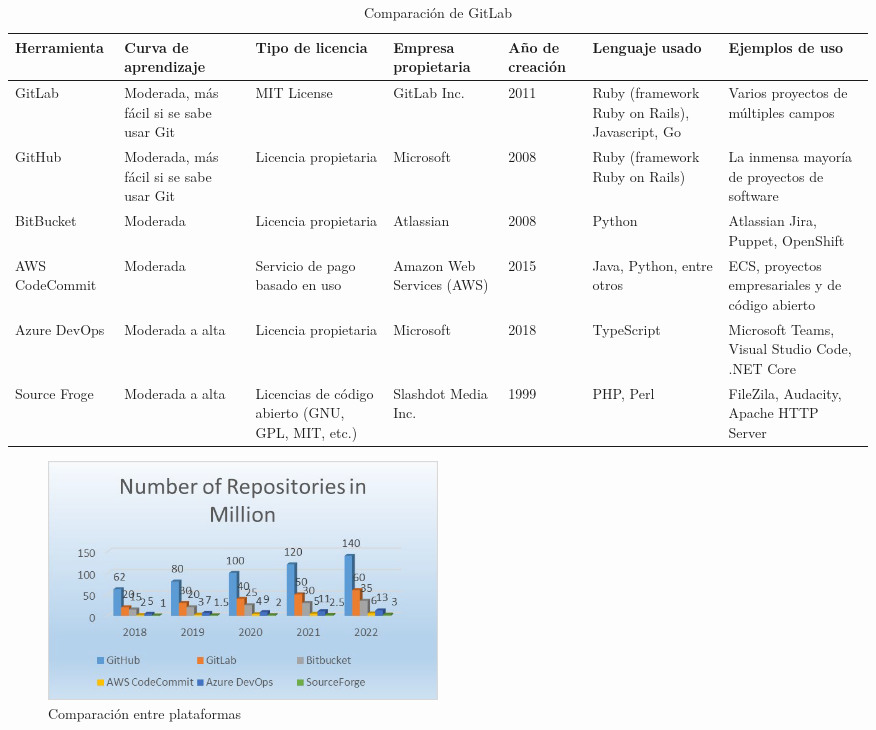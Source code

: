 \documentclass[runningheads]{llncs}
\begin{document}
\begin{table}
        \centering
        \caption{Comparación de GitLab}
        \begin{tabularx}{1.1\textwidth}{X || X | X | X | X | X | X}
            Herramienta & Curva de aprendizaje & Tipo de licencia & Empresa propietaria & Año de creación & Lenguaje usado & Ejemplos de uso \\
            \hline
            \hline
            GitLab & Moderada, más fácil si se sabe usar Git & MIT License & GitLab Inc. & 2011 & Ruby (framework Ruby on Rails), Javascript, Go & Varios proyectos de múltiples campos\\
            GitHub & Moderada, más fácil si se sabe usar Git & Licencia propietaria & Microsoft & 2008 & Ruby (framework Ruby on Rails) & La inmensa mayoría de proyectos de software\\
            BitBucket & Moderada & Licencia propietaria & Atlassian & 2008 & Python & Atlassian Jira, Puppet, OpenShift\\
            AWS CodeCommit & Moderada & Servicio de pago basado en uso & Amazon Web Services (AWS) & 2015 & Java, Python, entre otros & ECS, proyectos empresariales y de código abierto\\
            Azure DevOps & Moderada a alta & Licencia propietaria & Microsoft & 2018 & TypeScript & Microsoft Teams, Visual Studio Code, .NET Core\\
            Source Froge & Moderada a alta & Licencias de código abierto (GNU, GPL, MIT, etc.) & Slashdot Media Inc. & 1999 & PHP, Perl & FileZila, Audacity, Apache HTTP Server\\
            \hline
        \end{tabularx}
        \label{table:3}
\end{table}
\begin{figure}[htbp]
        \centering
        \includegraphics[width=0.5\textwidth]{Comp-rep.png}
        \caption{Comparación entre plataformas}
        \label{fig:comp-rep}
\end{figure}
\end{document}
